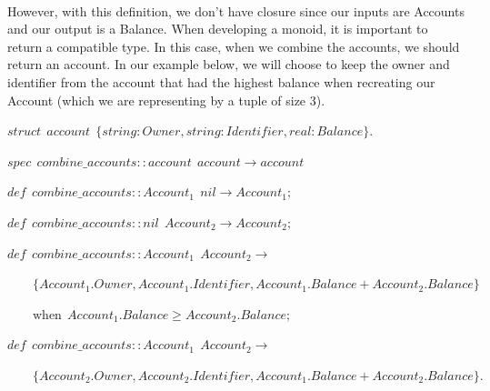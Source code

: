 \documentclass[
]{book}
\begin{document}
\(\nonumber\)

However, with this definition, we don't have closure since our inputs are Accounts and our output is a Balance. When developing a monoid, it is important to return a compatible type. In this case, when we combine the accounts, we should return an account. In our example below, we will choose to keep the owner and identifier from the account that had the highest balance when recreating our Account (which we are representing by a tuple of size 3).

\begin{formulabox}
\(struct ~ ~ account ~ ~ \lbrace string:Owner, string:Identi\mathit{f}ier, real:Balance \rbrace.\)

\(spec ~ ~ combine\_accounts :: account ~~ account \rightarrow account\)

\(de\mathit{f} ~ ~ combine\_accounts :: Account_1 ~ ~ nil \rightarrow Account_1;\)

\(de\mathit{f} ~ ~ combine\_accounts :: nil ~ ~ Account_2 \rightarrow Account_2;\)

\(de\mathit{f} ~ ~ combine\_accounts :: Account_1 ~~ Account_2 \rightarrow\)

\(\quad \quad \lbrace Account_1.Owner, Account_1.Identi\mathit{f}ier, Account_1.Balance + Account_2.Balance \rbrace ~ ~\)

\(\quad \quad \text{when} ~ ~ Account_1.Balance \ge Account_2.Balance ;\)

\(de\mathit{f} ~ ~ combine\_accounts :: Account_1 ~~ Account_2 \rightarrow\)

\(\quad \quad \lbrace Account_2.Owner, Account_2.Identi\mathit{f}ier, Account_1.Balance + Account_2.Balance \rbrace.\)

\end{formulabox}

\(\nonumber\)
\end{document}
